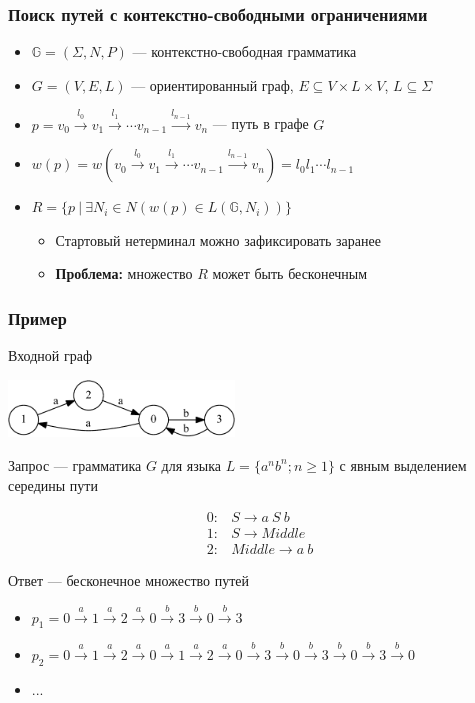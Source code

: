 \documentclass[xcolor=table]{beamer}
\begin{document}
\begin{frame}[fragile]
  \transwipe[direction=90]
  \frametitle{Поиск путей с контекстно-свободными ограничениями}
  \begin{itemize}
  \item $\mathbb{G} = (\Sigma, N, P)$ --- контекстно-свободная грамматика
  \item $G = (V,E,L)$ --- ориентированный граф, $E \subseteq V\times L \times V$, $L\subseteq \Sigma$
  \item $p = v_0 \xrightarrow{l_0} v_1 \xrightarrow{l_1} \cdots v_{n-1}\xrightarrow{l_{n-1}}v_n$ --- путь в графе $G$
  \item $w(p) = w(v_0 \xrightarrow{l_0} v_1 \xrightarrow{l_1} \cdots v_{n-1}\xrightarrow{l_{n-1}}v_n) = l_0 l_1 \cdots l_{n-1}$
  \item $R =\{ p \ | \ \exists N_i \in N (w(p) \in L(\mathbb{G},N_i))\}$
  \begin{itemize}
    \item Стартовый нетерминал можно зафиксировать заранее
    \item \textbf{Проблема:} множество $R$ может быть бесконечным
  \end{itemize}
  \end{itemize}
\end{frame}

\begin{frame}[fragile]
  \transwipe[direction=90]
  \frametitle{Пример}
Входной граф \\
\begin{center}
        \includegraphics[width=0.45\textwidth]{pictures/input.pdf} 
\end{center}
Запрос --- грамматика $G$ для языка $L=\{a^n b^n; n \geq 1\}$ с явным выделением середины пути \\
\begin{center}
   \[
\begin{array}{rl} 
   0:& S \rightarrow a \ S \ b \\
   1:& S \rightarrow Middle \\
   2:& Middle \rightarrow a \ b
\end{array}
\]
\end{center}
\vspace{0.8em}
Ответ --- бесконечное множество путей
\begin{itemize}
\item $p_1 = 0\xrightarrow{a}1\xrightarrow{a}2\xrightarrow{a}0\xrightarrow{b}3\xrightarrow{b}0\xrightarrow{b}3$
\item $p_2 = 0\xrightarrow{a}1\xrightarrow{a}2\xrightarrow{a}0\xrightarrow{a}1\xrightarrow{a}2\xrightarrow{a}0\xrightarrow{b}3\xrightarrow{b}0\xrightarrow{b}3\xrightarrow{b}0\xrightarrow{b}3\xrightarrow{b}0$
\item ...
\end{itemize}

\end{frame}
\end{document}
